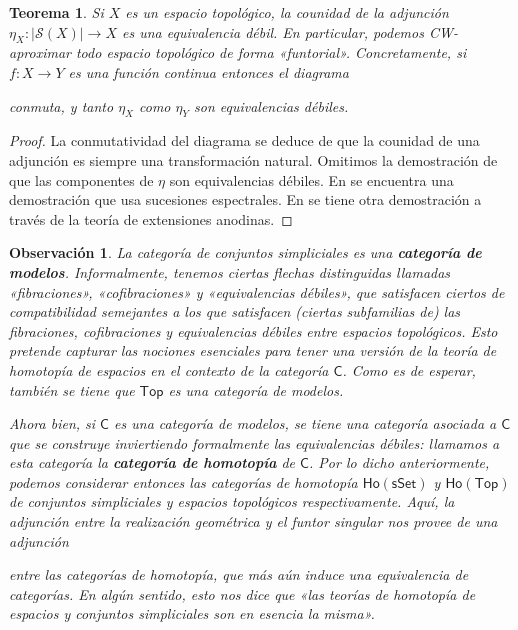 \documentclass[11pt]{report}
\theoremstyle{colored}
\newtheorem{theorem}{Teorema}[section]
\newtheorem{remark}{Observación}[section]
\newcommand{\cat}[1]{\mathsf{#1}}
\newcommand{\guill}[1]{«#1»}
\begin{document}
\begin{theorem} Si $X$ es un espacio topológico, la counidad de la adjunción $\eta_X : |\mathcal{S}(X)|\to X$ es una equivalencia débil. En particular, podemos CW-aproximar todo espacio topológico de forma \guill{funtorial}. Concretamente, si $f : X \to Y$ es una función continua entonces el diagrama
\begin{center}
\end{center}
conmuta, y tanto $\eta_X$ como $\eta_Y$ son equivalencias débiles.
\end{theorem}
\begin{proof} La conmutatividad del diagrama se deduce de que la counidad de una adjunción es siempre una transformación natural. Omitimos la demostración de que las componentes de $\eta$ son equivalencias débiles. En \cite{M} se encuentra una demostración que usa sucesiones espectrales. En \cite{GJ} se tiene otra demostración a través de la teoría de extensiones anodinas. 
\end{proof}

\begin{remark} La categoría de conjuntos simpliciales es una \textbf{categoría de modelos}. Informalmente, tenemos ciertas flechas distinguidas llamadas \guill{fibraciones}, \guill{cofibraciones} y \guill{equivalencias débiles}, que satisfacen ciertos de compatibilidad semejantes a los que satisfacen (ciertas subfamilias de) las fibraciones, cofibraciones y equivalencias débiles entre espacios topológicos. Esto pretende capturar las nociones esenciales para tener una versión de la teoría de homotopía de espacios en el contexto de la categoría $\cat{C}$. Como es de esperar, también se tiene que $\cat{Top}$ es una categoría de modelos.

Ahora bien, si $\cat{C}$ es una categoría de modelos, se tiene una categoría asociada a $\cat{C}$ que se construye inviertiendo formalmente las equivalencias débiles: llamamos a esta categoría la \textbf{categoría de homotopía} de $\cat{C}$. Por lo dicho anteriormente, podemos considerar entonces las categorías de homotopía $\cat{Ho(sSet)}$ y $\cat{Ho(Top)}$ de conjuntos simpliciales y espacios topológicos respectivamente. Aquí, la adjunción entre la realización geométrica y el funtor singular nos provee de una adjunción
\begin{center}
\end{center}
entre las categorías de homotopía, que más aún induce una equivalencia de categorías. En algún sentido, esto nos dice que \guill{las teorías de homotopía de espacios y conjuntos simpliciales son en esencia la misma}. 

\end{remark}
\end{document}
